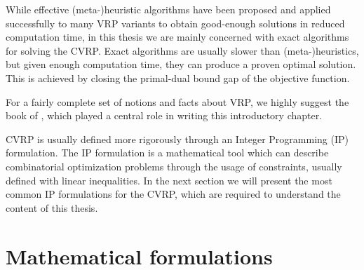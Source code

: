 While effective (meta-)heuristic algorithms have been proposed and applied
successfully to many VRP variants to obtain good-enough solutions
in reduced computation time, in this thesis we are mainly concerned
with exact algorithms for solving the CVRP.
Exact algorithms are usually slower than (meta-)heuristics, but given
enough computation time, they can produce a proven optimal solution.
This is achieved by closing the primal-dual bound gap of the objective function.

For a fairly complete set of notions and facts about VRP, we highly suggest
the book  of \textcite{toth2014}, which
played a central role in writing this introductory chapter.


CVRP is usually defined more rigorously through an Integer Programming (IP) formulation.
The IP formulation is a mathematical tool which can describe combinatorial optimization problems
through the usage of constraints, usually defined with linear inequalities.
In the next section we will present the most common IP formulations for the CVRP, which
are required to understand the content of this thesis.


\begin{comment}
\cite{toth2002}
The distribution of goods concerns the service, in a given time period, of a set of
customers by a set of vehicles, which are located in one or more depots, are operated by a
set of crews (drivers), and perform their movements by using an appropriate road network. In
particular, the solution of a VRP calls for the determination of a set of routes, each performed
by a single vehicle that starts and ends at its own depot, such that all the requirements
of the customers are fulfilled, all the operational constraints are satisfied, and the global
transportation cost is minimized. In this section, we describe the typical characteristics of
the routing and scheduling problems by considering their main components (road network,
customers, depots, vehicles, and drivers), the different operational constraints that can be
imposed on the construction of the routes, and the possible objectives to be achieved in the
optimization process.
The road network, used for the transportation of goods, is generally described through
a graph, whose arcs represent the road sections and whose vertices correspond to the road
junctions and to the depot and customer locations.
\end{comment}

\section{Mathematical formulations}
\label{sec:intro-cvrp-mathematical-formulations}

